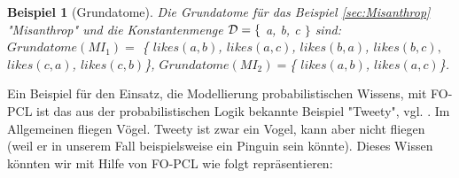 \documentclass[a4paper, 11pt]{book}
\newtheorem{Bsp}{Beispiel}[section]
\begin{document}
\begin{Bsp}[Grundatome]
Die Grundatome für das Beispiel \ref{sec:Misanthrop} "{}Misanthrop"{} und die Konstantenmenge $ \cal{D} = \{$ a, b, c $\} $  sind:\\
$ Grundatome(MI_{1}) = $  \{ $likes(a, b) $, $likes(a, c) $, $likes(b, a) $, $likes(b, c),  $ $likes(c, a)$, $likes(c, b) $\}, $Grundatome(MI_{2}) = $\{ $likes(a, b)  $, $likes(a, c)  $\}. \\
	
	
\end{Bsp}


Ein Beispiel für den Einsatz, die Modellierung probabilistischen Wissens, mit FO-PCL ist das aus der probabilistischen Logik bekannte Beispiel "{}Tweety"{}, vgl. \cite[Bsp. 8.30, S. 261]{BKI08}. Im Allgemeinen fliegen Vögel. Tweety ist zwar ein Vogel, kann aber nicht fliegen (weil er in unserem Fall beispielsweise ein Pinguin sein könnte). Dieses Wissen könnten wir mit Hilfe von FO-PCL wie folgt repräsentieren:
\end{document}

